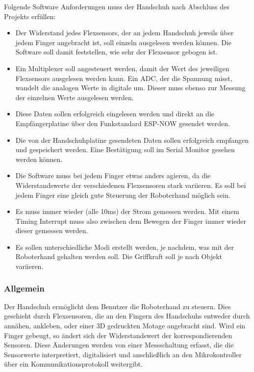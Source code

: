 \documentclass[11pt]{article}
\begin{document}
Folgende Software Anforderungen muss der Handschuh nach Abschluss des Projekts erfüllen:
	\begin{itemize}
		\item Der Widerstand jedes Flexsensors, der an jedem Handschuh jeweils über jedem Finger angebracht ist, soll einzeln 
			  ausgelesen werden können. Die Software soll damit feststellen, wie sehr der Flexsensor gebogen ist.
		\item Ein Multiplexer soll angesteuert werden, damit der Wert des jeweiligen Flexsensors ausgelesen werden kann. 
			  Ein ADC, der die Spannung misst, wandelt die analogen Werte in digitale um. Dieser muss ebenso zur Messung der einzelnen 
			  Werte ausgelesen werden.
		\item Diese Daten sollen erfolgreich eingelesen werden und direkt an die Empfängerplatine über den Funkstandard ESP-NOW 
			  gesendet werden.
		\item Die von der Handschuhplatine gesendeten Daten sollen erfolgreich empfangen und gespeichert werden. Eine Bestätigung 
			  soll im Serial Monitor gesehen werden können.
		\item Die Software muss bei jedem Finger etwas anders agieren, da die Widerstandswerte der verschiedenen Flexsensoren stark 
			  variieren. Es soll bei jedem Finger eine gleich gute Steuerung der Roboterhand möglich sein.
		\item Es muss immer wieder (alle 10ms) der Strom gemessen werden. Mit einem Timing Interrupt muss also zwischen dem Bewegen 
			  der Finger immer wieder dieser gemessen werden.
		\item Es sollen unterschiedliche Modi erstellt werden, je nachdem, was mit der Roboterhand gehalten werden soll. Die 
			  Griffkraft soll je nach Objekt variieren.
\end{itemize}

\subsubsection{Allgemein}
Der Handschuh ermöglicht dem Benutzer die Roboterhand zu steuern. Dies geschieht durch Flexsensoren, die an den Fingern des 
Handschuhs entweder durch annähen, ankleben, oder einer 3D gedruckten Motage angebracht sind. Wird ein Finger gebeugt, so ändert
sich der Widerstandswert der korrespondierenden Sensoren. Diese Änderungen werden von einer Messschaltung erfasst, die die Sensorwerte
interpretiert, digitalisiert und anschließlich an den Mikrokontroller über ein Kommunikationsprotokoll weitergibt. \\
\end{document}
